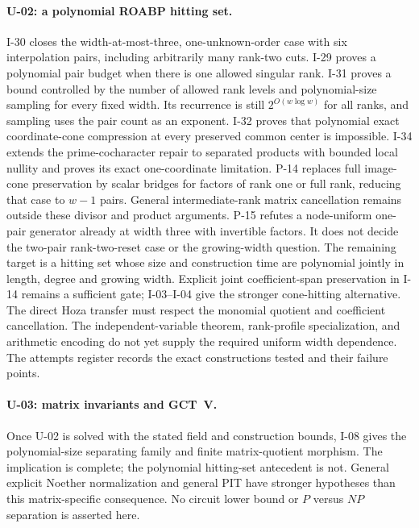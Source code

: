 \documentclass[11pt,a4paper]{article}
\theoremstyle{definition}\newtheorem{definition}{Definition}
\begin{document}
\paragraph{U-02: a polynomial ROABP hitting set.}
I-30 closes the width-at-most-three, one-unknown-order case with six interpolation pairs, including arbitrarily many rank-two cuts. I-29 proves a polynomial pair budget when there is one allowed singular rank. I-31 proves a bound controlled by the number of allowed rank levels and polynomial-size sampling for every fixed width. Its recurrence is still $2^{O(w\log w)}$ for all ranks, and sampling uses the pair count as an exponent. I-32 proves that polynomial exact coordinate-cone compression at every preserved common center is impossible. I-34 extends the prime-cocharacter repair to separated products with bounded local nullity and proves its exact one-coordinate limitation. P-14 replaces full image-cone preservation by scalar bridges for factors of rank one or full rank, reducing that case to $w-1$ pairs. General intermediate-rank matrix cancellation remains outside these divisor and product arguments. P-15 refutes a node-uniform one-pair generator already at width three with invertible factors. It does not decide the two-pair rank-two-reset case or the growing-width question. The remaining target is a hitting set whose size and construction time are polynomial jointly in length, degree and growing width. Explicit joint coefficient-span preservation in I-14 remains a sufficient gate; I-03--I-04 give the stronger cone-hitting alternative. The direct Hoza transfer must respect the monomial quotient and coefficient cancellation. The independent-variable theorem, rank-profile specialization, and arithmetic encoding do not yet supply the required uniform width dependence. The attempts register records the exact constructions tested and their failure points.

\paragraph{U-03: matrix invariants and GCT~V.}
Once U-02 is solved with the stated field and construction bounds, I-08 gives the polynomial-size separating family and finite matrix-quotient morphism. The implication is complete; the polynomial hitting-set antecedent is not. General explicit Noether normalization and general PIT have stronger hypotheses than this matrix-specific consequence. No circuit lower bound or $P$ versus $NP$ separation is asserted here.
\end{document}
